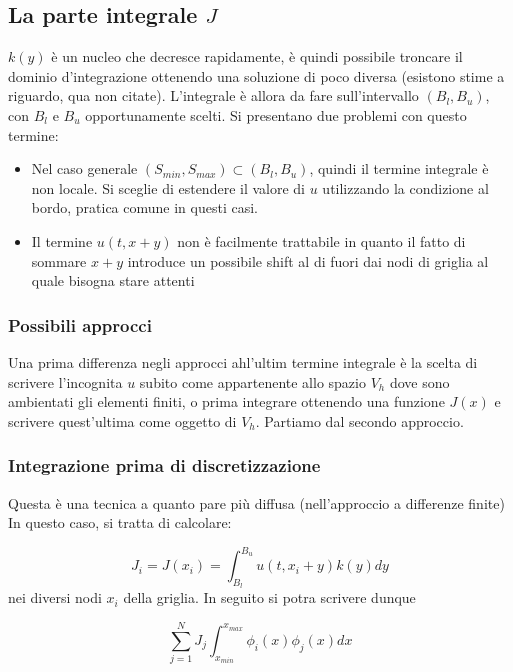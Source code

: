 \documentclass[a4paper,10pt]{article}
\begin{document}
\subsection{La parte integrale $J$}

$k(y)$ è un nucleo che decresce rapidamente, è quindi possibile troncare il dominio d'integrazione ottenendo una soluzione di poco diversa (esistono stime a riguardo, qua non citate). L'integrale è allora da fare sull'intervallo $(B_l,B_u)$, con $B_l$ e $B_u$ opportunamente scelti. Si presentano due problemi con questo termine:

\begin{itemize}
 \item Nel caso generale $(S_{min},S_{max}) \subset (B_l,B_u)$, quindi il termine integrale è non locale. Si sceglie di estendere il valore di $u$ utilizzando la condizione al bordo, pratica comune in questi casi.
 \item Il termine $u(t,x+y)$ non è facilmente trattabile in quanto il fatto di sommare $x+y$ introduce un possibile shift al di fuori dai nodi di griglia al quale bisogna stare attenti
\end{itemize}

\subsubsection{Possibili approcci}

Una prima differenza negli approcci ahl'ultim termine integrale è la scelta di scrivere l'incognita $u$ subito come appartenente allo spazio $V_h$ dove sono ambientati gli elementi finiti, o prima integrare ottenendo una funzione $J(x)$ e scrivere quest'ultima come oggetto di $V_h$. Partiamo dal secondo approccio.

\subsubsection{Integrazione prima di discretizzazione}

Questa è una tecnica a quanto pare più diffusa (nell'approccio a differenze finite)
In questo caso, si tratta di calcolare: 

\begin{equation*}
 J_i=J(x_i)=\int_{B_l}^{B_u}u(t,x_i+y)k(y)dy
\end{equation*}
nei diversi nodi $x_i$ della griglia. In seguito si potra scrivere dunque 

\begin{equation*}
 \sum_{j=1}^N J_j\int_{x_{min}}^{x_{max}} \phi_i(x)\phi_j(x)dx
\end{equation*}
\end{document}

